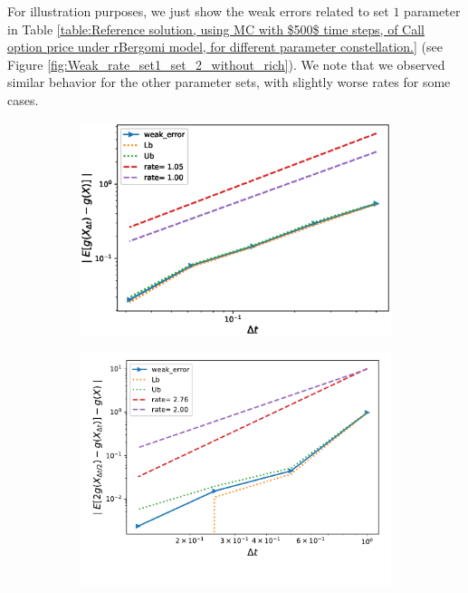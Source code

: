 \FloatBarrier

For illustration purposes, we just show the weak errors related to set $1$ parameter in Table \ref{table:Reference solution, using MC with $500$ time steps, of Call option price under rBergomi model, for different parameter constellation.} (see Figure \ref{fig:Weak_rate_set1_set_2_without_rich}). We note that we observed similar behavior for the other parameter sets, with slightly worse rates for some cases.


\begin{figure}[h!]
	\centering
	\begin{subfigure}{.4\textwidth}
		\centering
		\includegraphics[width=1\linewidth]{./figures/rBergomi_weak_error_rates/without_richardson/H_007/weak_convergence_order_Bergomi_H_007_K_1_M_10_6_CI_relative}
		\caption{}
		\label{fig:sub3}
	\end{subfigure}%
	\begin{subfigure}{.4\textwidth}
		\centering
		\includegraphics[width=1\linewidth]{./figures/rBergomi_weak_error_rates/with_richardson/H_007/weak_convergence_order_Bergomi_H_007_K_1_richardson_relative_M_10_6}
		\caption{}
		\label{fig:sub4}
	\end{subfigure}
	

\end{figure}
